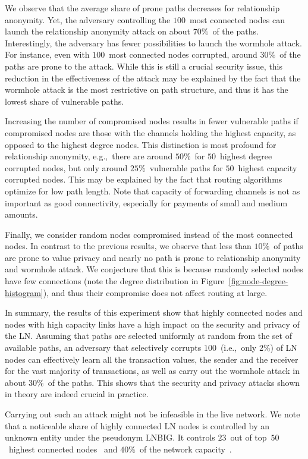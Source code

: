 We observe that the average share of prone paths decreases for relationship anonymity.
Yet, the adversary controlling the $100$~most connected nodes can launch the relationship anonymity attack on about $70\%$~of the paths.
Interestingly, the adversary has fewer possibilities to launch the wormhole attack.
For instance, even with $100$~most connected nodes corrupted, around $30\%$~of the paths are prone to the attack.
While this is still a crucial security issue, this reduction in the effectiveness of the attack may be explained by the fact that the wormhole attack is the most restrictive on path structure, and thus it has the lowest share of vulnerable paths.

Increasing the number of compromised nodes results in fewer vulnerable paths if compromised nodes are those with the channels holding the highest capacity, as opposed to the highest degree nodes.
This distinction is most profound for relationship anonymity, e.g.,~there are around $50\%$~for $50$~highest degree corrupted nodes, but only around $25\%$~vulnerable paths for $50$~highest capacity corrupted nodes.
This may be explained by the fact that routing algorithms optimize for low path length.
Note that capacity of forwarding channels is not as important as good connectivity, especially for payments of small and medium amounts.

Finally, we consider random nodes compromised instead of the most connected nodes.
In contrast to the previous results, we observe that less than $10\%$~of paths are prone to value privacy and nearly no path is prone 
to relationship anonymity and wormhole attack.
We conjecture that this is because randomly selected nodes have few connections (note the degree distribution in Figure~\ref{fig:node-degree-histogram}), and thus their compromise does not affect routing at large.

In summary, the results of this experiment show that highly connected nodes and nodes with high capacity links have a high impact on the security and privacy of the LN\@.
Assuming that paths are selected uniformly at random from the set of available paths, an adversary that selectively corrupts $100$~(i.e.,~only $2\%$) of LN nodes can effectively learn all the transaction values, the sender and the receiver for the vast majority of transactions, as well as carry out the wormhole attack in about $30\%$~of the paths.
This shows that the security and privacy attacks shown in theory are indeed crucial in practice.

Carrying out such an attack might not be infeasible in the live network.
We note that a noticeable share of highly connected LN nodes is controlled by an unknown entity under the pseudonym LNBIG.
It controls $23$~out of top~$50$~highest connected nodes~\cite{1MLTopConnected} and $40\%$~of the network capacity~\cite{TheBlockLNBIG}.


